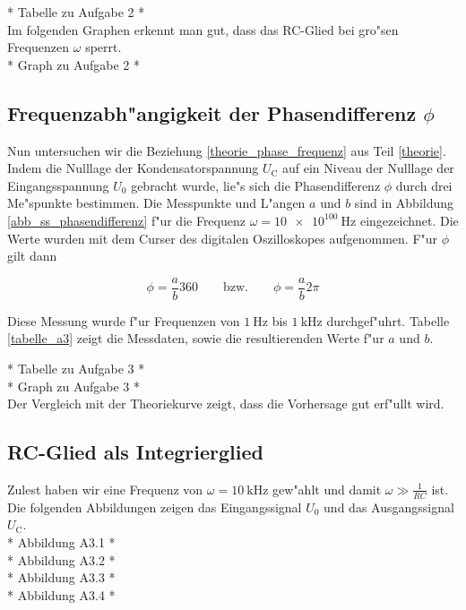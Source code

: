 \documentclass{scrartcl}
\begin{document}
			* Tabelle zu Aufgabe 2 * \\

			Im folgenden Graphen erkennt man gut, dass das RC-Glied bei gro"sen Frequenzen $\omega$ sperrt.\\

			* Graph zu Aufgabe 2 * \\


		\subsection{Frequenzabh"angigkeit der Phasendifferenz $\phi$}

			Nun untersuchen wir die Beziehung \ref{theorie_phase_frequenz} aus Teil \ref{theorie}.
			Indem die Nulllage der Kondensatorspannung $U_{\mathrm{C}}$ auf ein Niveau der Nulllage der Eingangsspannung $U_0$ gebracht wurde,
			lie"s sich die Phasendifferenz $\phi$ durch drei Me"spunkte bestimmen.
			Die Messpunkte und L"angen $a$ und $b$ sind in Abbildung \ref{abb_ss_phasendifferenz} f"ur die Frequenz $\omega = \SI{10e100}{\hertz}$ eingezeichnet.
			Die Werte wurden mit dem Curser des digitalen Oszilloskopes aufgenommen.
			F"ur $\phi$ gilt dann

			\begin{displaymath}
				\phi = \frac{a}{b}360 \qquad
				\mathrm{bzw.} \qquad
				\phi = \frac{a}{b}2\pi
			\end{displaymath}

			Diese Messung wurde f"ur Frequenzen von $\SI{1}{\hertz}$ bis $\SI{1}{\kilo\hertz}$ durchgef"uhrt. Tabelle \ref{tabelle_a3} zeigt die Messdaten, sowie die resultierenden Werte f"ur $a$ und $b$.

			* Tabelle zu Aufgabe 3 * \\

			* Graph zu Aufgabe 3 * \\

			Der Vergleich mit der Theoriekurve zeigt, dass die Vorhersage gut erf"ullt wird.

		\subsection{RC-Glied als Integrierglied}

			Zulest haben wir eine Frequenz von $\omega = \SI{10}{\kilo\hertz}$ gew"ahlt und damit $\omega \gg \frac{1}{RC}$ ist.
			Die folgenden Abbildungen zeigen das Eingangssignal $U_0$ und das Ausgangssignal $U_{\mathrm{C}}$.\\

			* Abbildung A3.1 * \\

			* Abbildung A3.2 * \\

			* Abbildung A3.3 * \\

			* Abbildung A3.4 * \\
\end{document}
